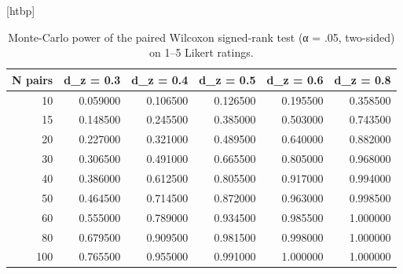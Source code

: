 \begin{table}
\small[htbp]
\caption{Monte-Carlo power of the paired Wilcoxon signed-rank test (α = .05, two-sided) on 1–5 Likert ratings.}
\label{tab:S15_power_wilcoxon}
\begin{tabular}{rrrrrr}
\toprule
N pairs & d\_z = 0.3 & d\_z = 0.4 & d\_z = 0.5 & d\_z = 0.6 & d\_z = 0.8 \\
\midrule
10 & 0.059000 & 0.106500 & 0.126500 & 0.195500 & 0.358500 \\
15 & 0.148500 & 0.245500 & 0.385000 & 0.503000 & 0.743500 \\
20 & 0.227000 & 0.321000 & 0.489500 & 0.640000 & 0.882000 \\
30 & 0.306500 & 0.491000 & 0.665500 & 0.805000 & 0.968000 \\
40 & 0.386000 & 0.612500 & 0.805500 & 0.917000 & 0.994000 \\
50 & 0.464500 & 0.714500 & 0.872000 & 0.963000 & 0.998500 \\
60 & 0.555000 & 0.789000 & 0.934500 & 0.985500 & 1.000000 \\
80 & 0.679500 & 0.909500 & 0.981500 & 0.998000 & 1.000000 \\
100 & 0.765500 & 0.955000 & 0.991000 & 1.000000 & 1.000000 \\
\bottomrule
\end{tabular}
\end{table}
